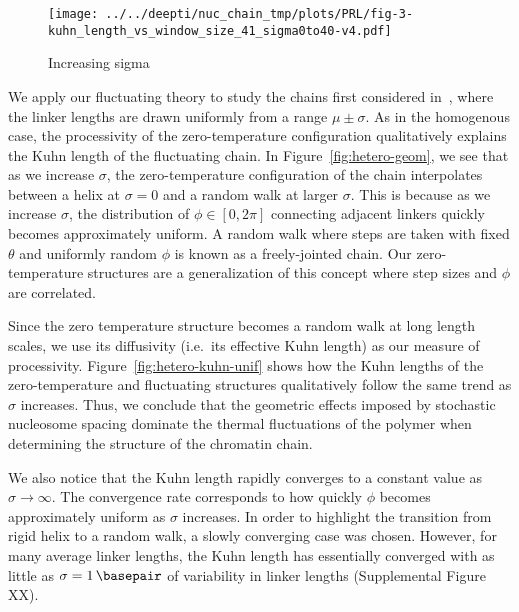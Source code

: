 \documentclass[%
 reprint,
superscriptaddress,
showpacs,preprintnumbers,
 amsmath,amssymb,
 aps,
 prl,
]{revtex4-1}
\begin{document}
\begin{figure}
    \centering
    \texttt{[image: ../../deepti/nuc\_chain\_tmp/plots/PRL/fig-3-kuhn\_length\_vs\_window\_size\_41\_sigma0to40-v4.pdf]}
    \caption{Increasing sigma}
\end{figure}

We apply our fluctuating theory to study the chains first considered
    in~\cite{woodcock1993}, where the linker lengths are drawn uniformly from a
    range $\mu \pm \sigma$.
As in the homogenous case, the processivity of the zero-temperature
    configuration qualitatively explains the Kuhn length of the fluctuating chain.
In Figure~\ref{fig:hetero-geom}, we see that as we increase $\sigma$, the
    zero-temperature configuration of the chain interpolates between a helix at
    $\sigma = 0$ and a random walk at larger $\sigma$.
This is because as we increase $\sigma$, the distribution of $\phi \in [0, 2\pi]$ connecting
    adjacent linkers quickly becomes approximately uniform.
A random walk where steps are taken with fixed $\theta$ and uniformly
    random $\phi$ is known as a freely-jointed chain.
Our zero-temperature structures are a generalization of this concept where step
    sizes and $\phi$ are correlated.

Since the zero temperature structure becomes a random walk at long length
    scales, we use its diffusivity (i.e.\ its effective Kuhn length) as our
    measure of processivity.
Figure~\ref{fig:hetero-kuhn-unif} shows how the Kuhn lengths of the
zero-temperature and fluctuating structures qualitatively follow the same trend
as $\sigma$ increases.
Thus, we conclude that the geometric effects imposed by
    stochastic nucleosome spacing dominate the thermal fluctuations of the
    polymer when determining the structure of the chromatin chain.

We also notice that the Kuhn length rapidly converges to
a constant value as $\sigma\to\infty$.
The convergence rate corresponds to how quickly $\phi$ becomes approximately
    uniform as $\sigma$ increases.
In order to highlight the transition from rigid helix to a random walk, a slowly
    converging case was chosen.
However, for many average linker lengths, the Kuhn length has essentially
    converged with as little as $\sigma = \SI{1}{\basepair}$ of variability in
    linker lengths (Supplemental Figure XX).
\end{document}
